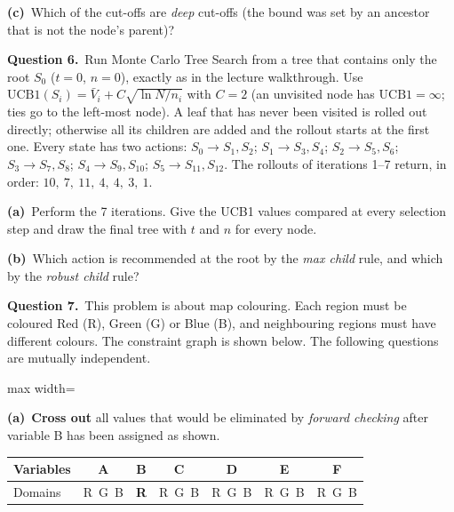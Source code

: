 \documentclass[11pt,a4paper]{article}
\newcommand{\question}[1]{\par\medskip\noindent\textbf{Question #1.}\ }
\newcommand{\subq}[1]{\par\smallskip\noindent\textbf{#1}\ }
\begin{document}
\subq{(c)}Which of the cut-offs are \emph{deep} cut-offs (the bound was set by an ancestor that is not the node's parent)?
\begin{ansbox}[height=1.0cm]\end{ansbox}
\clearpage
\question{6}Run Monte Carlo Tree Search from a tree that contains only the root $S_0$ ($t=0$, $n=0$), exactly as in the lecture walkthrough. Use $\mathrm{UCB1}(S_i)=\bar V_i + C\sqrt{\ln N/n_i}$ with $C=2$ (an unvisited node has $\mathrm{UCB1}=\infty$; ties go to the left-most node). A leaf that has never been visited is rolled out directly; otherwise all its children are added and the rollout starts at the first one. Every state has two actions: $S_0\to S_1,S_2$; $S_1\to S_3,S_4$; $S_2\to S_5,S_6$; $S_3\to S_7,S_8$; $S_4\to S_9,S_{10}$; $S_5\to S_{11},S_{12}$. The rollouts of iterations 1--7 return, in order: $10,\ 7,\ 11,\ 4,\ 4,\ 3,\ 1$.
\subq{(a)}Perform the 7 iterations. Give the UCB1 values compared at every selection step and draw the final tree with $t$ and $n$ for every node.
\begin{ansbox}[height=11.0cm]\end{ansbox}
\subq{(b)}Which action is recommended at the root by the \emph{max child} rule, and which by the \emph{robust child} rule?
\begin{ansbox}[height=1.2cm]\end{ansbox}
\clearpage
\question{7}This problem is about map colouring. Each region must be coloured Red (R), Green (G) or Blue (B), and neighbouring regions must have different colours. The constraint graph is shown below. The following questions are mutually independent.\begin{center}
\begin{adjustbox}{max width=\linewidth}
\end{adjustbox}
\end{center}
\subq{(a)}\textbf{Cross out} all values that would be eliminated by \emph{forward checking} after variable B has been assigned as shown.\begin{center}\small\begin{tabular}{|l|c|c|c|c|c|c|}\hline Variables & \textbf{A} & \textbf{B} & \textbf{C} & \textbf{D} & \textbf{E} & \textbf{F}\\ \hline Domains & R\ G\ B & \textbf{R} & R\ G\ B & R\ G\ B & R\ G\ B & R\ G\ B\\ \hline\end{tabular}\end{center}
\end{document}
